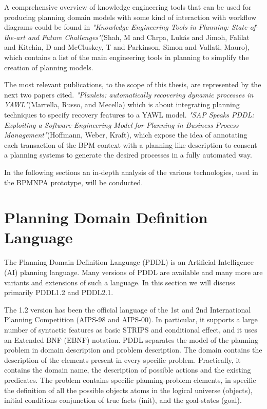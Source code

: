 A comprehensive overview of knowledge engineering tools that can be used for producing planning domain models with some kind of interaction with workflow diagrams could be found in \textit{"Knowledge Engineering Tools in Planning: State-of-the-art and Future Challenges"}(Shah, M and Chrpa, Luk{\'a}s and Jimoh, Falilat and Kitchin, D and McCluskey, T and Parkinson, Simon and Vallati, Mauro), which contains a list of the main engineering tools in planning to simplify the creation of planning models.\cite{shah2013knowledge}

The most relevant publications, to the scope of this thesis, are represented by the next two papers cited.
\textit{"Planlets: automatically recovering dynamic processes in YAWL"}(Marrella, Russo, and Mecella) which is about integrating planning techniques to specify recovery features to a YAWL model\cite{marrella2012planlets}.
\textit{"SAP Speaks PDDL: Exploiting a Software-Engineering Model for Planning in Business Process Management"}(Hoffmann, Weber, Kraft), which expose the idea of annotating each transaction of the BPM context with a planning-like description to consent a planning systems to generate the desired processes in a fully automated way.\cite{hoffmann2012sap}


In the following sections an in-depth analysis of the various technologies, used in the BPMNPA prototype, will be conducted.

\newpage
\section{Planning Domain Definition Language}
\label{sec:context}
The Planning Domain Definition Language (PDDL) is an Artificial Intelligence (AI) planning language. Many versions of PDDL are available and many more are variants and extensions of such a language. In this section we will discuss primarily PDDL1.2 and PDDL2.1. 

The 1.2 version has been the official language of the 1st and 2nd International Planning Competition (AIPS-98 and AIPS-00)\cite{ips}. In particular, it supports a large number of syntactic features as basic STRIPS and conditional effect, and it uses an Extended BNF (EBNF) notation. PDDL separates the model of the planning problem in domain description and problem description. 
The domain contains the description of the elements present in every specific problem. 
Practically, it contains the domain name, the description of possible actions and the existing predicates. 
The problem contains specific planning-problem elements, in specific the definition of all the possible objects atoms in the logical universe (objects), initial conditions conjunction of true facts (init), and the goal-states (goal).\cite{mcdermott1998pddl}

